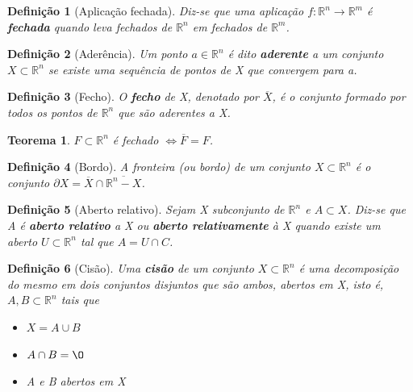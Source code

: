 \documentclass[12pt]{article}
\newtheorem{theorem}{Teorema}
\newtheorem{definition}{Definição}
\begin{document}
\begin{definition}[Aplicação fechada]
Diz-se que uma aplicação $f: \mathbb{R}^n \rightarrow \mathbb{R}^m$ é \textbf{fechada} quando leva fechados de $\mathbb{R}^n$ em fechados de $\mathbb{R}^m$.
\end{definition}

\begin{definition}[Aderência]
Um ponto $a \in \mathbb{R}^n$ é dito \textbf{aderente} a um conjunto $X \subset \mathbb{R}^n$ se existe uma sequência de pontos de X que convergem para a.
\end{definition}

\begin{definition}[Fecho]
O \textbf{fecho} de X, denotado por $\overline{X}$, é o conjunto formado por todos os pontos de $\mathbb{R}^n$ que são aderentes a X.
\end{definition}

\begin{theorem}
$F \subset \mathbb{R}^n$ é fechado $\Longleftrightarrow \overline{F} = F$.
\end{theorem}

\begin{definition}[Bordo]
A fronteira (ou bordo) de um conjunto $X \subset \mathbb{R}^n$ é o conjunto $\partial X = \overline{X} \cap \overline{\mathbb{R}^n - X}$.
\end{definition}

\begin{definition}[Aberto relativo]
Sejam X subconjunto de $\mathbb{R}^n$ e $A \subset X$. Diz-se que A é \textbf{aberto relativo} a X ou \textbf{aberto relativamente} à X quando existe um aberto $U \subset \mathbb{R}^n$ tal que $A = U \cap C$.
\end{definition}

\begin{definition}[Cisão]
Uma \textbf{cisão} de um conjunto $X \subset \mathbb{R}^n$ é uma decomposição do mesmo em dois conjuntos disjuntos que são ambos, abertos em X, isto é, $A, B \subset \mathbb{R}^n$ tais que

\begin{itemize}
    \item $X = A \cup B$
    
    \item $A \cap B = \O$
    
    \item A e B abertos em X
\end{itemize}
\end{definition}
\end{document}
